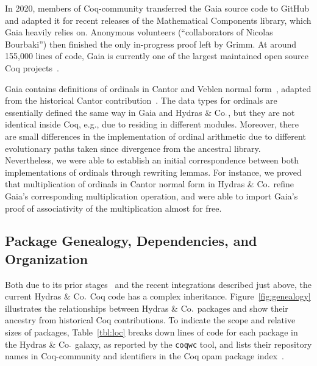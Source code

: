 \documentclass{easychair}
\newcommand{\coq}{Coq\xspace}
\newcommand{\community}{Coq-community\xspace}
\newcommand{\gaia}{Gaia\xspace}
\newcommand{\Hydras}{Hydras \& Co$\text.$\xspace}
\begin{document}
In 2020, members of \community transferred the \gaia source code to GitHub and adapted it for recent releases of the Mathematical Components library, which \gaia heavily relies on. Anonymous volunteers (``collaborators of Nicolas Bourbaki'') then finished the only in-progress proof left by Grimm. At around 155,000 lines of code, \gaia is currently one of the largest maintained open source \coq projects~\cite{Gaia}.

\gaia contains definitions of ordinals in Cantor and Veblen normal form~\cite{grimm:hal-00911710}, adapted from the historical Cantor contribution~\cite{CantorContrib}. The data types for ordinals are essentially defined the same way in \gaia and \Hydras, but they are not identical inside \coq, e.g., due to residing in different modules. Moreover, there are small differences in the implementation of ordinal arithmetic due to different evolutionary paths taken since divergence from the ancestral library.
%
Nevertheless, we were able to establish an initial correspondence between both implementations of ordinals through rewriting lemmas. For instance, we proved that multiplication of ordinals in Cantor normal form in \Hydras refine \gaia's corresponding multiplication operation, and were able to import \gaia's proof of associativity of the multiplication almost for free.

\subsection{Package Genealogy, Dependencies, and Organization}

Both due to its prior stages~\cite{PCiota,JFLA2018paper} and the recent integrations described just above, the current \Hydras \coq code has a complex inheritance. Figure~\ref{fig:genealogy} illustrates the relationships between \Hydras packages and show their ancestry from historical Coq contributions. To indicate the scope and relative sizes of packages, Table~\ref{tbl:loc} breaks down lines of code for each package in the \Hydras galaxy, as reported by the \texttt{coqwc} tool, and lists their repository names in \community and identifiers in the \coq opam package index~\cite{CoqPackageIndex}.
\end{document}
